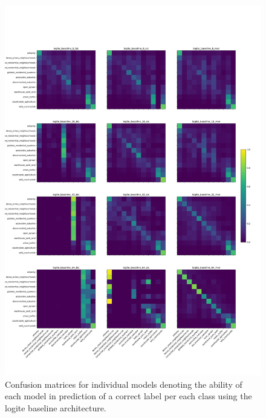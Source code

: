 \begin{figure}
    \centering
    \includegraphics[width=.9\linewidth]{fig/logite_baseline_cm.png}
    \caption{\footnotesize Confusion matrices for individual models denoting
    the ability of each model in prediction of a correct label per each class
    using the logite baseline architecture.}
    \label{fig:logite_baseline_cm}
\end{figure}


